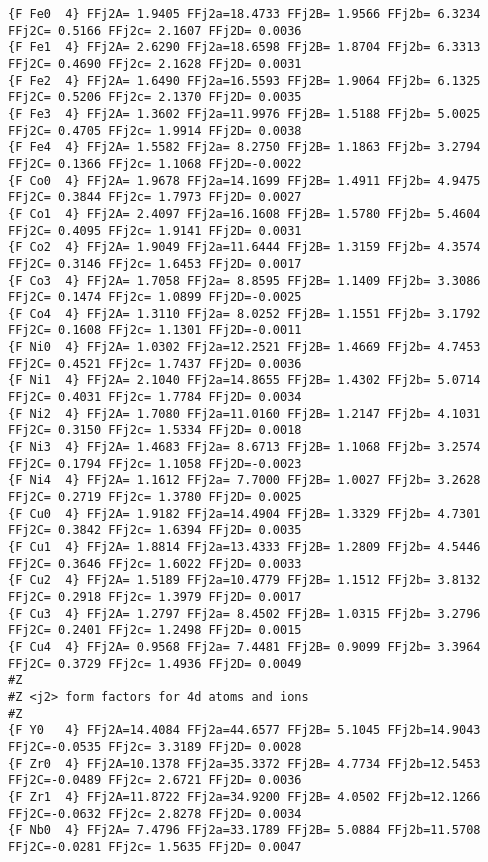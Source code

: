 {\begin{verbatim}
{F Fe0  4} FFj2A= 1.9405 FFj2a=18.4733 FFj2B= 1.9566 FFj2b= 6.3234 FFj2C= 0.5166 FFj2c= 2.1607 FFj2D= 0.0036 
{F Fe1  4} FFj2A= 2.6290 FFj2a=18.6598 FFj2B= 1.8704 FFj2b= 6.3313 FFj2C= 0.4690 FFj2c= 2.1628 FFj2D= 0.0031 
{F Fe2  4} FFj2A= 1.6490 FFj2a=16.5593 FFj2B= 1.9064 FFj2b= 6.1325 FFj2C= 0.5206 FFj2c= 2.1370 FFj2D= 0.0035 
{F Fe3  4} FFj2A= 1.3602 FFj2a=11.9976 FFj2B= 1.5188 FFj2b= 5.0025 FFj2C= 0.4705 FFj2c= 1.9914 FFj2D= 0.0038 
{F Fe4  4} FFj2A= 1.5582 FFj2a= 8.2750 FFj2B= 1.1863 FFj2b= 3.2794 FFj2C= 0.1366 FFj2c= 1.1068 FFj2D=-0.0022 
{F Co0  4} FFj2A= 1.9678 FFj2a=14.1699 FFj2B= 1.4911 FFj2b= 4.9475 FFj2C= 0.3844 FFj2c= 1.7973 FFj2D= 0.0027 
{F Co1  4} FFj2A= 2.4097 FFj2a=16.1608 FFj2B= 1.5780 FFj2b= 5.4604 FFj2C= 0.4095 FFj2c= 1.9141 FFj2D= 0.0031 
{F Co2  4} FFj2A= 1.9049 FFj2a=11.6444 FFj2B= 1.3159 FFj2b= 4.3574 FFj2C= 0.3146 FFj2c= 1.6453 FFj2D= 0.0017 
{F Co3  4} FFj2A= 1.7058 FFj2a= 8.8595 FFj2B= 1.1409 FFj2b= 3.3086 FFj2C= 0.1474 FFj2c= 1.0899 FFj2D=-0.0025 
{F Co4  4} FFj2A= 1.3110 FFj2a= 8.0252 FFj2B= 1.1551 FFj2b= 3.1792 FFj2C= 0.1608 FFj2c= 1.1301 FFj2D=-0.0011 
{F Ni0  4} FFj2A= 1.0302 FFj2a=12.2521 FFj2B= 1.4669 FFj2b= 4.7453 FFj2C= 0.4521 FFj2c= 1.7437 FFj2D= 0.0036 
{F Ni1  4} FFj2A= 2.1040 FFj2a=14.8655 FFj2B= 1.4302 FFj2b= 5.0714 FFj2C= 0.4031 FFj2c= 1.7784 FFj2D= 0.0034 
{F Ni2  4} FFj2A= 1.7080 FFj2a=11.0160 FFj2B= 1.2147 FFj2b= 4.1031 FFj2C= 0.3150 FFj2c= 1.5334 FFj2D= 0.0018 
{F Ni3  4} FFj2A= 1.4683 FFj2a= 8.6713 FFj2B= 1.1068 FFj2b= 3.2574 FFj2C= 0.1794 FFj2c= 1.1058 FFj2D=-0.0023 
{F Ni4  4} FFj2A= 1.1612 FFj2a= 7.7000 FFj2B= 1.0027 FFj2b= 3.2628 FFj2C= 0.2719 FFj2c= 1.3780 FFj2D= 0.0025 
{F Cu0  4} FFj2A= 1.9182 FFj2a=14.4904 FFj2B= 1.3329 FFj2b= 4.7301 FFj2C= 0.3842 FFj2c= 1.6394 FFj2D= 0.0035 
{F Cu1  4} FFj2A= 1.8814 FFj2a=13.4333 FFj2B= 1.2809 FFj2b= 4.5446 FFj2C= 0.3646 FFj2c= 1.6022 FFj2D= 0.0033 
{F Cu2  4} FFj2A= 1.5189 FFj2a=10.4779 FFj2B= 1.1512 FFj2b= 3.8132 FFj2C= 0.2918 FFj2c= 1.3979 FFj2D= 0.0017 
{F Cu3  4} FFj2A= 1.2797 FFj2a= 8.4502 FFj2B= 1.0315 FFj2b= 3.2796 FFj2C= 0.2401 FFj2c= 1.2498 FFj2D= 0.0015 
{F Cu4  4} FFj2A= 0.9568 FFj2a= 7.4481 FFj2B= 0.9099 FFj2b= 3.3964 FFj2C= 0.3729 FFj2c= 1.4936 FFj2D= 0.0049 
#Z
#Z <j2> form factors for 4d atoms and ions
#Z
{F Y0   4} FFj2A=14.4084 FFj2a=44.6577 FFj2B= 5.1045 FFj2b=14.9043 FFj2C=-0.0535 FFj2c= 3.3189 FFj2D= 0.0028 
{F Zr0  4} FFj2A=10.1378 FFj2a=35.3372 FFj2B= 4.7734 FFj2b=12.5453 FFj2C=-0.0489 FFj2c= 2.6721 FFj2D= 0.0036 
{F Zr1  4} FFj2A=11.8722 FFj2a=34.9200 FFj2B= 4.0502 FFj2b=12.1266 FFj2C=-0.0632 FFj2c= 2.8278 FFj2D= 0.0034 
{F Nb0  4} FFj2A= 7.4796 FFj2a=33.1789 FFj2B= 5.0884 FFj2b=11.5708 FFj2C=-0.0281 FFj2c= 1.5635 FFj2D= 0.0047 

\end{verbatim}}
